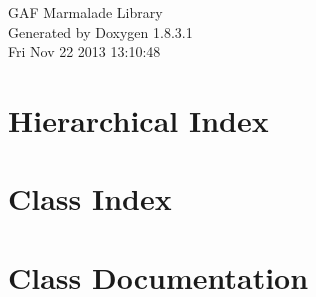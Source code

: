 \documentclass{book}
\begin{document}
\hypersetup{pageanchor=false,citecolor=blue}
\begin{titlepage}
\vspace*{7cm}
\begin{center}
{\Large G\-A\-F Marmalade Library }\\
\vspace*{1cm}
{\large Generated by Doxygen 1.8.3.1}\\
\vspace*{0.5cm}
{\small Fri Nov 22 2013 13:10:48}\\
\end{center}
\end{titlepage}
\clearemptydoublepage
{}
\tableofcontents
\clearemptydoublepage
{}
\hypersetup{pageanchor=true,citecolor=blue}
\chapter{Hierarchical Index}

\chapter{Class Index}

\chapter{Class Documentation}



































\printindex
\end{document}
